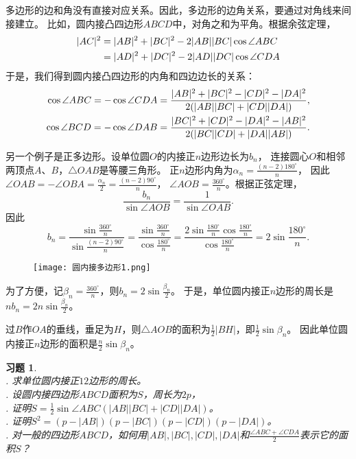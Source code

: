 \documentclass[12pt,UTF8]{ctexbook}
\newtheorem{xt}{习题}[section]
\begin{document}
多边形的边和角没有直接对应关系。因此，多边形的边角关系，要通过对角线来间接建立。
比如，圆内接凸四边形$ABCD$中，对角之和为平角。根据余弦定理，
\begin{align}
    |AC|^2 &= |AB|^2 + |BC|^2 -2|AB||BC|\cos\angle ABC \notag \\
    &= |AD|^2 + |DC|^2 -2|AD||DC|\cos\angle CDA \notag
\end{align}
于是，我们得到圆内接凸四边形的内角和四边边长的关系：
\begin{align}
    \cos\angle ABC = -\cos \angle CDA &= \frac{|AB|^2 + |BC|^2 - |CD|^2 - |DA|^2 }{2(|AB||BC| + |CD||DA|)}, \notag \\
    \cos\angle BCD = -\cos \angle DAB &= \frac{|BC|^2 + |CD|^2 - |DA|^2 - |AB|^2 }{2(|BC||CD| + |DA||AB|)}. \notag 
\end{align}

另一个例子是正多边形。设单位圆$O$的内接正$n$边形边长为$b_n$，
连接圆心$O$和相邻两顶点$A$、$B$，$\triangle OAB$是等腰三角形。
正$n$边形内角为$\alpha_n = \frac{(n-2)180^\circ}{n}$，
因此$\angle OAB = -\angle OBA = \frac{\alpha_n}{2} = \frac{(n-2)90^\circ}{n}$，
$\angle AOB = \frac{360^\circ}{n}$。根据正弦定理，
$$ \frac{b_n}{\sin \angle AOB} = \frac{1}{\sin \angle OAB}.$$
因此
$$b_n = \frac{\sin \frac{360^\circ}{n}}{\sin \frac{(n-2)90^\circ}{n}} = \frac{\sin \frac{360^\circ}{n}}{\cos \frac{180^\circ}{n}} = \frac{2\sin \frac{180^\circ}{n}\cos \frac{180^\circ}{n}}{\cos \frac{180^\circ}{n}} = 2\sin \frac{180^\circ}{n}.$$

\begin{figure}[h] %
    \vspace{4pt}
    \centering
    \texttt{[image: 圆内接多边形1.png]}
\end{figure}

为了方便，记$\beta_n = \frac{360^\circ}{n}$，则$b_n = 2\sin \frac{\beta_n}{2}$。
于是，单位圆内接正$n$边形的周长是$nb_n = 2n\sin \frac{\beta_n}{2}$。

过$B$作$OA$的垂线，垂足为$H$，则$\triangle AOB$的面积为$\frac12 |BH|$，即$\frac12 \sin{\beta_n}$。
因此单位圆内接正$n$边形的面积是$\frac{n}{2} \sin{\beta_n}$。

\begin{xt}\label{xt:2-6-10}
    \mbox{} \\
    . 求单位圆内接正$12$边形的周长。\\
    . 设圆内接四边形$ABCD$面积为$S$，周长为$2p$，\\
    . 证明$S = \frac12 \sin \angle ABC (|AB||BC| + |CD||DA|)$。 \\
    . 证明$S^2 = (p - |AB|)(p - |BC|)(p - |CD|)(p - |DA|)$。\\
    . 对一般的四边形$ABCD$，如何用$|AB|, |BC|, |CD|, |DA|$和$\frac{\angle ABC + \angle CDA}{2}$表示它的面积$S$？
\end{xt}
\end{document}
